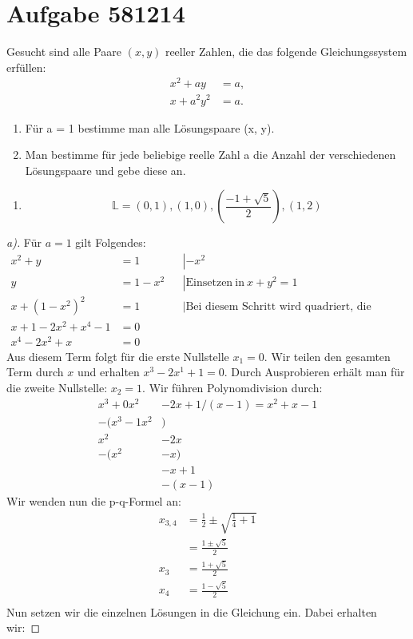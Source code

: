 \documentclass{article}
\begin{document}
\section{Aufgabe 581214}
Gesucht sind alle Paare $(x, y)$ reeller Zahlen, die das folgende Gleichungssystem erfüllen:
\begin{align}
x^2 + ay &= a,\\
x + a^2y^2 &= a.
\end{align}
\begin{enumerate}[label=\alph*)]
	\item Für a = 1 bestimme man alle Lösungspaare (x, y).
	\item Man bestimme für jede beliebige reelle Zahl a die Anzahl der verschiedenen Lösungspaare
	und gebe diese an.
\end{enumerate}
\begin{enumerate}[label=\alph*)]
	\item \[\mathbb{L} = (0,1) , (1,0) , (\frac{-1+\sqrt{5}}{2}) , (1,2)\]
\end{enumerate}

\begin{proof}[a)]
	Für $a=1$ gilt Folgendes:
	\begin{align*}
	x^2+y&=1&&\left|-x^2\right.\\
	y&=1-x^2&&\left|\mathrm{Einsetzen\ in\ }x+y^2=1\right.\\
	x+\left(1-x^2\right)^2&=1&&\left|\text{Bei diesem Schritt wird quadriert, die Lösungen müssen also nachher überprüft werden}\right.\\
	x+1-2x^2+x^4-1&=0\\
	x^4-2x^2+x&=0
	\end{align*}
	Aus diesem Term folgt für die erste Nullstelle $x_1 = 0$. Wir teilen den gesamten Term durch $x$ und erhalten $x^3-2x^1+1=0$.
	Durch Ausprobieren erhält man für die zweite Nullstelle: $x_2=1$.
	Wir führen Polynomdivision durch:
	\begin{align*}
		x^3+0x^2&-2x+1/(x-1)=x^2+x-1\\
		-(x^3-1x^2&)\\
		x^2&-2x\\
		-(x^2&-x)\\
		&-x+1\\
		&-(x-1)
	\end{align*}
	Wir wenden nun die p-q-Formel an:\\
	\begin{align*}
		x_{3,4}&=\frac{1}{2}\pm\sqrt{\frac{1}{4}+1}\\
		&=\frac{1\pm\sqrt{5}}{2}\\
		x_3&=\frac{1+\sqrt{5}}{2}\\
		x_4&=\frac{1-\sqrt{5}}{2}\\
	\end{align*}
	Nun setzen wir die einzelnen Lösungen in die Gleichung ein.
	Dabei erhalten wir:
	
\end{proof}
\end{document}
